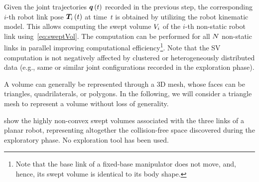 Given the joint trajectories ${\bm{q}\left( t \right)}$ recorded in the previous step,
the corresponding $i$-th robot link pose ${\bm{T}_{i}\left( t \right)}$ at time~$t$ is obtained 
by utilizing the robot kinematic model.
This allows computing the swept volume ${V_{i}}$ of the $i$-th non-static robot link using~\eqref{eq:sweptVol}. 
The computation can be performed for all ${N}$ non-static links 
in parallel improving computational efficiency\footnote{Note that the base link of a fixed-base manipulator does not move, 
and, 
hence, 
its swept volume is identical to its body shape.}.
Note that the SV computation is not negatively affected by clustered or heterogeneously distributed data 
(e.g., same or similar joint configurations recorded in the exploration phase).

A volume can generally be represented through a 3D mesh, 
whose faces can be triangles, 
quadrilaterals, or polygons.
In the following, we will consider a triangle mesh to represent a volume without loss of generality.

 show the highly non-convex swept volumes associated with the three links of a planar robot, 
representing altogether the collision-free space discovered during the exploratory phase. 
No exploration tool has been used.

